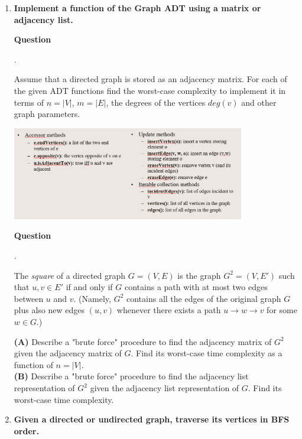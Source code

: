 \documentclass[a4paper,12pt]{article}
\newcounter{mcounter}
\newcommand\showmcounter{\addtocounter{mcounter}{1}\themcounter}
\begin{document}
{\begin{enumerate}[label=1.\Alph*.]
\vspace{10pt}
{\bf Question \showmcounter.}
A directed graph has $n$ nodes and each vertex has in-degree (the number of inbound edges)
equal to $3$ or to $5$, and an out-degree (the number of outbound edges) equal to $5$ or to $7$. 
What is the possible total number of edges in this graph?




\item {\bf Implement a function of the Graph ADT using a matrix or adjacency list.}

\vspace{10pt}
{\bf Question \showmcounter.}
Assume that a directed graph is stored as an adjacency matrix.
For each of the given ADT functions find the worst-case complexity to 
implement it in terms of $n = |V|$, $m = |E|$, the degrees of the vertices $deg(v)$
and other graph parameters.

\begin{center}
\includegraphics[width=4in]{ds-exam3/graph-adt.png}
\end{center}



\vspace{10pt}
{\bf Question \showmcounter.} 
The {\em square} of a directed graph $G=(V,E)$ is the graph $G^2=(V, E')$ such that
$u,v \in E'$ if and only if $G$ contains a path with at most two edges between $u$ and $v$.
(Namely, $G^2$ contains all the edges of the original graph $G$ plus also new edges 
$(u,v)$ whenever there exists a path $u \rightarrow w \rightarrow v$ for some $w \in G$.)

{\bf (A)} Describe a "brute force" procedure to find the adjacency matrix of $G^2$ 
given the adjacency matrix of $G$. Find its worst-case time complexity as a function 
of $n = |V|$.\\
{\bf (B)} Describe a "brute force" procedure to find the adjacency list representation of $G^2$ 
given the adjacency list representation of $G$. Find its worst-case time complexity.



\item {\bf Given a directed or undirected graph, traverse its vertices in BFS order.}


\end{enumerate}}
\end{document}
